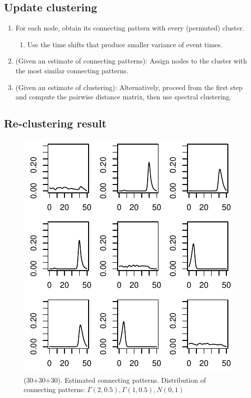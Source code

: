 \subsection*{Update clustering}
\begin{enumerate}
\item For each node, obtain its connecting pattern with every (permuted) cluster. 
\begin{enumerate}
\item Use the time shifts that produce smaller variance of event times.
\end{enumerate}

\item (Given an estimate of connecting patterns): Assign nodes to the cluster with the most similar connecting patterns.

\item (Given an estimate of clustering): Alternatively, proceed from the first step and compute the pairwise distance matrix, then use spectral clustering.
\end{enumerate}



\subsection*{Re-clustering result}


\begin{figure}[H]
\includegraphics[width=.6\textwidth]{../simulation/plots/case2_conn_patt}
\caption{(30+30+30). Estimated connecting patterns. Distribution of connecting patterns: $\Gamma(2,0.5),\Gamma(1,0.5),N(0,1)$}
\end{figure}


